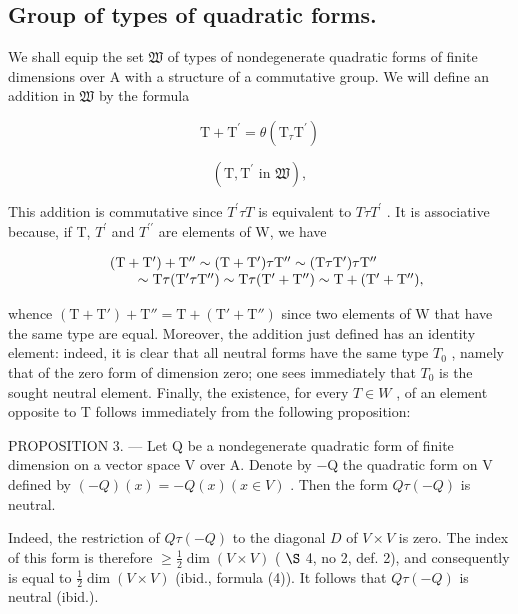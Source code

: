 \subsection{Group of types of quadratic forms.}

We shall equip the set \(\mathfrak{W}\) of types of nondegenerate quadratic forms of finite dimensions over A with a structure of a commutative group. We will define an addition in \(\mathfrak{W}\) by the formula

\[
\mathrm{T} + \mathrm{T} ^ {\prime} = \theta (\mathrm{T} _ {\tau} \mathrm{T} ^ {\prime})\tag{2}
\]

\[
(\mathrm{T}, \mathrm{T} ^ {\prime} \text {   in   } \mathfrak {W}),
\]

This addition is commutative since \(T^{\prime} \tau T\) is equivalent to \(T \tau T^{\prime}\) . It is associative because, if T, \(T^{\prime}\) and \(T^{\prime\prime}\) are elements of W, we have

\[
\begin{array}{r l} & (\mathrm{T} + \mathrm{T} ^ {\prime}) + \mathrm{T} ^ {\prime \prime} \sim (\mathrm{T} + \mathrm{T} ^ {\prime}) \tau \mathrm{T} ^ {\prime \prime} \sim (\mathrm{T} \tau \mathrm{T} ^ {\prime}) \tau \mathrm{T} ^ {\prime \prime} \\ & \qquad \sim \mathrm{T} \tau (\mathrm{T} ^ {\prime} \tau \mathrm{T} ^ {\prime \prime}) \sim \mathrm{T} \tau (\mathrm{T} ^ {\prime} + \mathrm{T} ^ {\prime \prime}) \sim \mathrm{T} + (\mathrm{T} ^ {\prime} + \mathrm{T} ^ {\prime \prime}), \end{array}
\]

whence \((\mathrm{T} + \mathrm{T}' ) + \mathrm{T}'' = \mathrm{T} + (\mathrm{T}' + \mathrm{T}'' )\) since two elements of W that have the same type are equal. Moreover, the addition just defined has an identity element: indeed, it is clear that all neutral forms have the same type \(T_{0}\) , namely that of the zero form of dimension zero; one sees immediately that \(T_{0}\) is the sought neutral element. Finally, the existence, for every \(T \in W\) , of an element opposite to T follows immediately from the following proposition:

PROPOSITION 3. — Let Q be a nondegenerate quadratic form of finite dimension on a vector space V over A. Denote by −Q the quadratic form on V defined by \((-Q)(x) = -Q(x) (x \in V)\) . Then the form \(Q \tau (-Q)\) is neutral.

Indeed, the restriction of \(Q \tau (-Q)\) to the diagonal \(D\) of \(V \times V\) is zero. The index of this form is therefore \(\geqslant\frac{1}{2}\dim(V\times V)\) ( \(\S\) 4, no 2, def. 2), and consequently is equal to \(\frac{1}{2}\dim(V\times V)\) (ibid., formula (4)). It follows that \(Q\tau(-Q)\) is neutral (ibid.).

